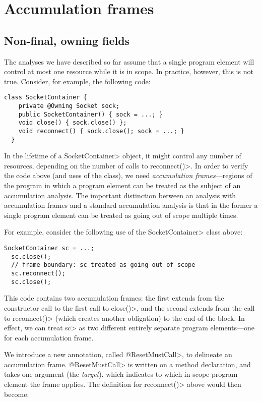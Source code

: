 \section{Accumulation frames}
\label{sec:reset-must-call}

\subsection{Non-final, owning fields}
\label{sec:non-final-owning}

The analyses we have described so far assume that a single program
element will control at most one resource while it is in scope.
In practice, however, this is not true. Consider, for example,
the following code:

\begin{lstlisting}[frame=tb,belowskip=3mm]
  class SocketContainer {
    private @Owning Socket sock;
    public SocketContainer() { sock = ...; } 
    void close() { sock.close() };
    void reconnect() { sock.close(); sock = ...; }
  }
\end{lstlisting}

In the lifetime of a \<SocketContainer> object, it might control any
number of resources, depending on the number of calls to
\<reconnect()>. In order to verify the code above (and uses of the
class), we need \emph{accumulation frames}---regions of the program in
which a program element can be treated as the subject of an
accumulation analysis. The important distinction between an analysis
with accumulation frames and a standard accumulation analysis is that
in the former a single program element can be treated as going out of
scope multiple times.

For example, consider the following use of the \<SocketContainer> class
above:

\begin{lstlisting}[frame=tb,belowskip=3mm]
  SocketContainer sc = ...;
  sc.close();
  // frame boundary: sc treated as going out of scope
  sc.reconnect();
  sc.close();
\end{lstlisting}

This code contains two accumulation frames: the first extends from the
constructor call to the first call to \<close()>, and the second
extends from the call to \<reconnect()> (which creates another
obligation) to the end of the block. In effect, we can treat \<sc> as
two different entirely separate program elements---one for each
accumulation frame.

We introduce a new annotation, called \<@ResetMustCall>, to delineate
an accumulation frame. \<@ResetMustCall> is written on a method
declaration, and takes one argument (the \emph{target}), which
indicates to which in-scope program element the frame applies. The
definition for \<reconnect()> above would then become:

